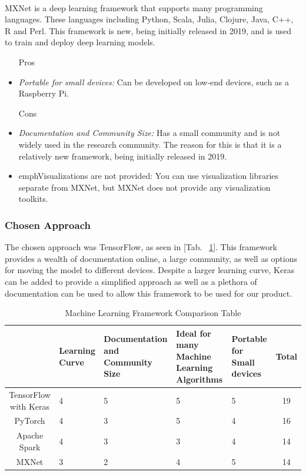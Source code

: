 \documentclass[12pt,journal,compsoc]{IEEEtran}
\newenvironment{subs}
  {\adjustwidth{1em}{0pt}}
  {\endadjustwidth}
\begin{document}
\begin{subs}
\begin{subs}
\begin{subs}
\\
MXNet is a deep learning framework that supports many programming languages. These languages including Python, Scala, Julia, Clojure, Java, C++, R and Perl. This framework is new, being initially released in 2019, and is used to train and deploy deep learning models.

\begin{subs}
\begin{itemize}
    \item [{Pros}]
    \item \emph{Portable for small devices:} Can be developed on low-end devices, such as a Raspberry Pi.
    \item [{Cons}]
    \item \emph{Documentation and Community Size:} Has a small community and is not widely used in the research community. The reason for this is that it is a relatively new framework, being initially released in 2019.
    \item emph{Visualizations are not provided:} You can use visualization libraries separate from MXNet, but MXNet does not provide any visualization toolkits. 
\end{itemize}
\end{subs}
\end{subs}

\subsubsection{Chosen Approach}
The chosen approach was TensorFlow, as seen in [Tab. ~\ref{table:train}]. This framework provides a wealth of documentation online, a large community, as well as options for moving the model to different devices. Despite a larger learning curve, Keras can be added to provide a simplified approach as well as a plethora of documentation can be used to allow this framework to be used for our product.

\begin{table}[H]
\renewcommand{\arraystretch}{1.3}
\caption{Machine Learning Framework Comparison Table}
\label{table:train}
\centering
\begin{tabular}{|c||m{8em}|m{8em}|m{8em}|m{8em}||c|}
\hline
&
Learning Curve
&
Documentation and Community Size
&
Ideal for many Machine Learning Algorithms
&
Portable for Small devices
&
Total\\
\hline
\hline
TensorFlow with Keras & 4 & 5 & 5 & 5 & 19\\
\hline
PyTorch & 4 & 3 & 5 & 4 & 16\\
\hline
Apache Spark & 4 & 3 & 3 & 4 & 14\\
\hline
MXNet & 3 & 2 & 4 & 5 & 14\\
\hline
\end{tabular}
\end{table}


\end{subs}
\end{subs}
\end{document}
